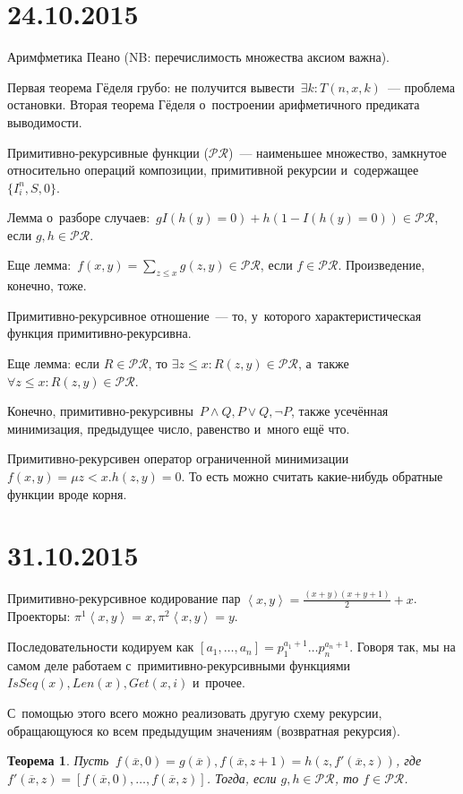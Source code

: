 \documentclass{article}
\newtheorem{theorem}{Теорема}
\theoremstyle{remark}
\renewcommand{\le}{\leqslant}
\begin{document}
\section*{24.10.2015}
Аримфметика Пеано (NB: перечислимость множества аксиом важна).

Первая теорема Гёделя грубо: не получится вывести~$\exists k: T(n, x, k)$~---
проблема остановки.
Вторая теорема Гёделя о~построении арифметичного предиката выводимости.

Примитивно-рекурсивные функции ($\mathcal{PR}$)~--- наименьшее множество,
замкнутое относительно операций композиции, примитивной рекурсии
и~содержащее~$\{I_i^n, S, 0\}$.

Лемма о~разборе случаев:~$g I(h(y) = 0) + h (1 - I(h(y) = 0)) \in \mathcal{PR}$,
если $g, h \in \mathcal{PR}$.

Еще лемма:~$f(x, y) = \sum_{z \le x} g(z, y) \in \mathcal{PR}$, если $f \in
\mathcal{PR}$. Произведение, конечно, тоже.

Примитивно-рекурсивное отношение~--- то, у~которого характеристическая функция
примитивно-рекурсивна.

Еще лемма: если $R \in \mathcal{PR}$, то $\exists z \le x: R(z, y) \in
\mathcal{PR}$, а~также~$\forall z \le x: R(z, y) \in \mathcal{PR}$.

Конечно, примитивно-рекурсивны~$P \land Q, P \lor Q, \neg P$, также усечённая
минимизация, предыдущее число, равенство и~много ещё что.

Примитивно-рекурсивен оператор ограниченной минимизации~$f(x, y) = \mu z <
x.h(z, y) = 0$. То есть можно считать какие-нибудь обратные функции вроде корня.

\section*{31.10.2015}

Примитивно-рекурсивное кодирование пар $\left<x, y\right> = \frac{(x + y)(x + y
+ 1)}{2} + x$. Проекторы: $\pi^1\left<x,y\right> = x, \pi^2\left<x,y\right> =
y$.

Последовательности кодируем как $[a_1, \ldots, a_n] = p_1^{a_1 + 1} \ldots
p_n^{a_n+1}$. Говоря так, мы на самом деле работаем с~примитивно-рекурсивными
функциями $IsSeq(x), Len(x), Get(x, i)$ и~прочее.

С~помощью этого всего можно реализовать другую схему рекурсии, обращающуюся
ко всем предыдущим значениям (возвратная рекурсия).

\begin{theorem}
  Пусть~$f(\overline{x}, 0) = g(\overline{x}), f(\overline{x}, z + 1) = h(z,
  f'(\overline{x},z))$, где~$f'(\overline{x}, z) = \left[f(\overline{x}, 0),
    \ldots, f(\overline{x}, z)\right]$. Тогда, если $g, h \in \mathcal{PR}$, то
    $f \in \mathcal{PR}$.
\end{theorem}
\end{document}
